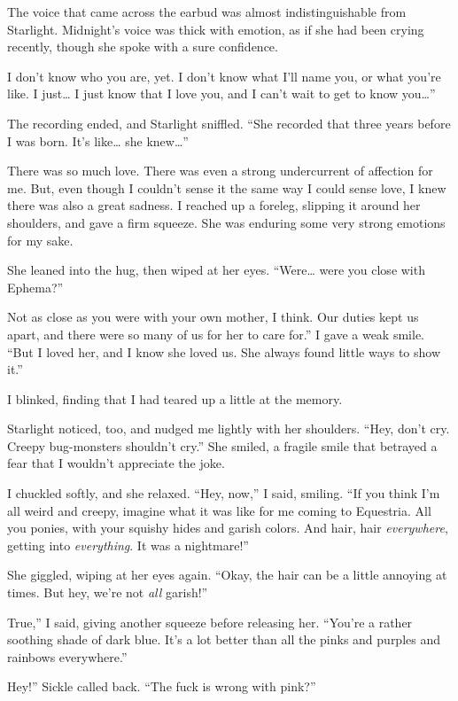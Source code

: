The voice that came across the earbud was almost indistinguishable from Starlight. Midnight’s voice was thick with emotion, as if she had been crying recently, though she spoke with a sure confidence.

\leavevmode{}I don’t know who you are, yet. I don’t know what I’ll name you, or what you’re like. I just… I just know that I love you, and I can’t wait to get to know you…”

The recording ended, and Starlight sniffled. “She recorded that three years before I was born. It’s like… she knew…”

There was so much love. There was even a strong undercurrent of affection for me. But, even though I couldn’t sense it the same way I could sense love, I knew there was also a great sadness. I reached up a foreleg, slipping it around her shoulders, and gave a firm squeeze. She was enduring some very strong emotions for my sake.

She leaned into the hug, then wiped at her eyes. “Were… were you close with Ephema?”

\leavevmode{}Not as close as you were with your own mother, I think. Our duties kept us apart, and there were so many of us for her to care for.” I gave a weak smile. “But I loved her, and I know she loved us. She always found little ways to show it.”

I blinked, finding that I had teared up a little at the memory.

Starlight noticed, too, and nudged me lightly with her shoulders. “Hey, don’t cry. Creepy bug-monsters shouldn’t cry.” She smiled, a fragile smile that betrayed a fear that I wouldn’t appreciate the joke.

I chuckled softly, and she relaxed. “Hey, now,” I said, smiling. “If you think I’m all weird and creepy, imagine what it was like for me coming to Equestria. All you ponies, with your squishy hides and garish colors. And hair, hair \textit{everywhere}, getting into \textit{everything}. It was a nightmare!”

She giggled, wiping at her eyes again. “Okay, the hair can be a little annoying at times. But hey, we’re not \textit{all} garish!”

\leavevmode{}True,” I said, giving another squeeze before releasing her. “You’re a rather soothing shade of dark blue. It’s a lot better than all the pinks and purples and rainbows everywhere.”

\leavevmode{}Hey!” Sickle called back. “The fuck is wrong with pink?”

